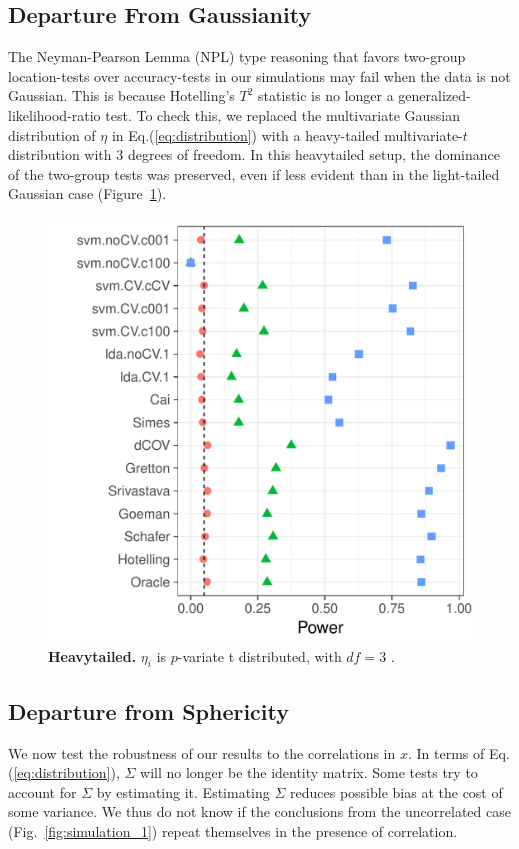 \documentclass[]{bio}
\begin{document}
\subsection{Departure From Gaussianity}
\label{sec:heavytailed}
The Neyman-Pearson Lemma (NPL) type reasoning that favors two-group location-tests over accuracy-tests in our simulations may fail when the data is not Gaussian.
This is because Hotelling's $T^2$ statistic is no longer a generalized-likelihood-ratio test. 
To check this, we replaced the multivariate Gaussian distribution of $\eta$ in Eq.(\ref{eq:distribution}) with a heavy-tailed multivariate-$t$ distribution with $3$ degrees of freedom.
In this heavytailed setup, the dominance of the two-group tests was preserved, even if less evident than in the light-tailed Gaussian case (Figure~\ref{fig:t_null}).



\begin{figure}[th]
	\centering
	\includegraphics[width=0.7\columnwidth]{"art/file9"}
	\caption{\textbf{Heavytailed.} $\eta_i$ is $p$-variate t distributed, with $df=3$ .  } 
	\label{fig:t_null}
\end{figure}




\subsection{Departure from Sphericity}
\label{sec:dependence}

We now test the robustness of our results to the correlations in $x$. 
In terms of Eq.(\ref{eq:distribution}), $\Sigma$ will no longer be the identity matrix. 
Some tests try to account for $\Sigma$ by estimating it. 
Estimating $\Sigma$ reduces possible bias at the cost of some variance. 
We thus do not know if the conclusions from the uncorrelated case (Fig.~\ref{fig:simulation_1}) repeat themselves in the presence of correlation. 
\end{document}
